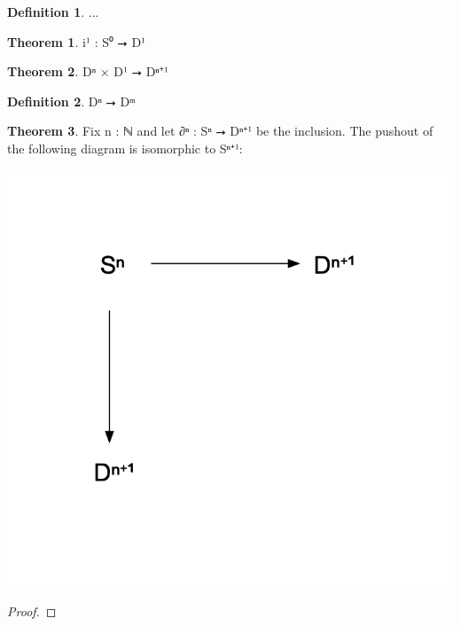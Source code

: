 \documentclass{book}
\theoremstyle{definition}
\newtheorem{definition}{Definition}
\newtheorem{theorem}{Theorem}
\begin{document}
\begin{definition}
...
\end{definition}

\begin{theorem}
i¹ : S⁰ ⭢ D¹ 
\end{theorem}

\begin{theorem}
Dⁿ × D¹ ⭢ Dⁿ⁺¹
\end{theorem}

\begin{definition}
Dⁿ ⭢ Dᵐ
\end{definition}


\begin{theorem}
Fix n : ℕ and let ∂ⁿ : Sⁿ ⭢ Dⁿ⁺¹ be the inclusion. The pushout of the following diagram is isomorphic to Sⁿ⁺¹:
\begin{center}
\includegraphics[scale=0.5]{pushout.png}
\end{center}
\end{theorem}

\begin{proof}

\end{proof}
\end{document}
